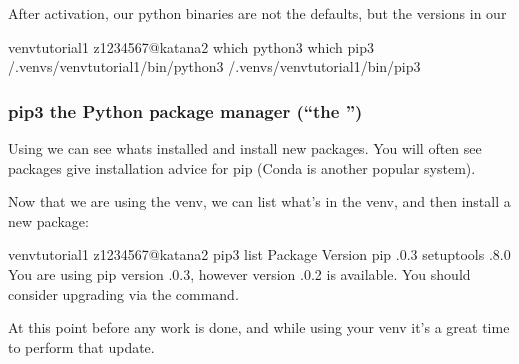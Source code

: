 \documentclass[letterpaper,10pt,english]{sphinxmanual}
\begin{document}
After activation, our python binaries are not the defaults, but the versions in our 

\begin{sphinxVerbatim}[commandchars=\\\{\}]
venv\PYGZhy{}tutorial\PYGZhy{}1 \PYG{o}{[}z1234567@katana2 \PYGZti{}\PYG{o}{]}\PYGZdl{} which python3 which pip3
\PYGZti{}/.venvs/venv\PYGZhy{}tutorial\PYGZhy{}1/bin/python3
\PYGZti{}/.venvs/venv\PYGZhy{}tutorial\PYGZhy{}1/bin/pip3
\end{sphinxVerbatim}


\subsubsection{pip3 \sphinxhyphen{} the Python package manager (“the ”)}
\label{\detokenize{software/python-virtualenvs:pip3-the-python-package-manager-the-package-installer-for-python}}
Using  we can see whats installed and install new packages. You will often see packages give installation advice for pip (Conda is another popular system).

Now that we are using the venv, we can list what’s in the venv, and then install a new package:

\begin{sphinxVerbatim}[commandchars=\\\{\}]
venv\PYGZhy{}tutorial\PYGZhy{}1 \PYG{o}{[}z1234567@katana2 \PYGZti{}\PYG{o}{]}\PYGZdl{} pip3 list
Package    Version
\PYGZhy{}\PYGZhy{}\PYGZhy{}\PYGZhy{}\PYGZhy{}\PYGZhy{}\PYGZhy{}\PYGZhy{}\PYGZhy{}\PYGZhy{} \PYGZhy{}\PYGZhy{}\PYGZhy{}\PYGZhy{}\PYGZhy{}\PYGZhy{}\PYGZhy{}
pip        .0.3
setuptools .8.0
You are using pip version .0.3, however version .0.2 is available.
You should consider upgrading via the  command.
\end{sphinxVerbatim}

At this point \sphinxhyphen{} before any work is done, and while using your venv \sphinxhyphen{} it’s a great time to perform that update.
\end{document}
